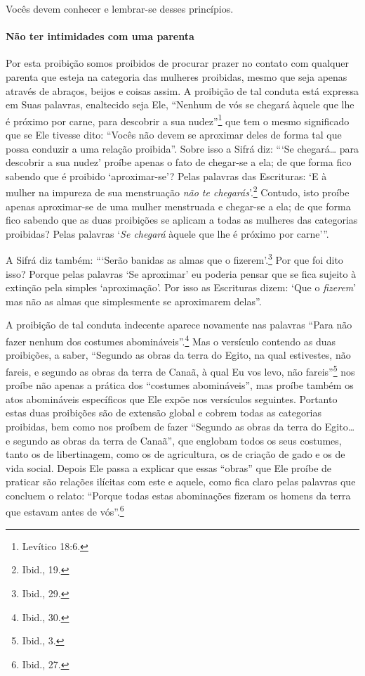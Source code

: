 Vocês devem conhecer e lembrar-se desses princípios.

\paragraph{Não ter intimidades com uma parenta}

Por esta proibição somos proibidos de procurar prazer no contato com
qualquer parenta que esteja na categoria das mulheres proibidas, mesmo
que seja apenas através de abraços, beijos e coisas assim. A proibição
de tal conduta está expressa em Suas palavras, enaltecido seja Ele,
``Nenhum de vós se chegará àquele que lhe é próximo por carne, para
descobrir a sua nudez''\footnote{Levítico 18:6.} que tem o mesmo significado que
se Ele tivesse dito: ``Vocês não devem se aproximar deles de forma tal
que possa conduzir a uma relação proibida''. Sobre isso a Sifrá diz:
```Se chegará\ldots{} para descobrir a sua nudez' proíbe apenas o fato de
chegar-se a ela; de que forma fico sabendo que é proibido
`aproximar-se'? Pelas palavras das Escrituras: `E à mulher na impureza
de sua menstruação \emph{não te chegarás}'.\footnote{Ibid., 19.} Contudo, isto
proíbe apenas aproximar-se de uma mulher menstruada e chegar-se a ela;
de que forma fico sabendo que as duas proibições se aplicam a todas as
mulheres das categorias proibidas? Pelas palavras `\emph{Se chegará}
àquele que lhe é próximo por carne'''.

A Sifrá diz também: ```Serão banidas as almas que o fizerem'.\footnote{Ibid.,
29.} Por que foi dito isso? Porque pelas palavras `Se aproximar' eu
poderia pensar que se fica sujeito à extinção pela simples
`aproximação'. Por isso as Escrituras dizem: `Que o \emph{fizerem}' mas
não as almas que simplesmente se aproximarem delas''.

A proibição de tal conduta indecente aparece novamente nas palavras
``Para não fazer nenhum dos costumes abomináveis''.\footnote{Ibid., 30.} Mas o
versículo contendo as duas proibições, a saber, ``Segundo as obras da
terra do Egito, na qual estivestes, não fareis, e segundo as obras da
terra de Canaã, à qual Eu vos levo, não fareis''\footnote{Ibid., 3.} nos proíbe
não apenas a prática dos ``costumes abomináveis'', mas proíbe também os
atos abomináveis específicos que Ele expõe nos versículos seguintes.
Portanto estas duas proibições são de extensão global e cobrem todas as
categorias proibidas, bem como nos proíbem de fazer ``Segundo as obras
da terra do Egito\ldots{} e segundo as obras da terra de Canaã'', que
englobam todos os seus costumes, tanto os de libertinagem, como os de
agricultura, os de criação de gado e os de vida social. Depois Ele
passa a explicar que essas ``obras'' que Ele proíbe de praticar são
relações ilícitas com este e aquele, como fica claro pelas palavras que
concluem o relato: ``Porque todas estas abominações fizeram os homens da
terra que estavam antes de vós''.\footnote{Ibid., 27.}

